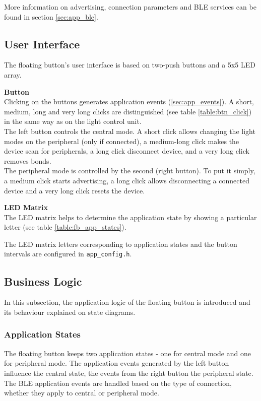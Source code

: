         More information on advertising, connection parameters and BLE services can be found in section \ref{sec:app_ble}.
    
    \subsection{User Interface}
        The floating button's user interface is based on two-push buttons and a 5x5 LED array.
        
        \textbf{Button}\\
            Clicking on the buttons generates application events (\ref{sec:app_events}). A short, medium, long and very long clicks are distinguished (see table \ref{table:btn_click}) in the same way as on the light control unit.\\
            The left button controls the central mode. A short click allows changing the light modes on the peripheral (only if connected), a medium-long click makes the device scan for peripherals, a long click disconnect device, and a very long click removes bonds.\\
            The peripheral mode is controlled by the second (right button). To put it simply, a medium click starts advertising, a long click allows disconnecting a connected device and a very long click resets the device.
            
        \textbf{LED Matrix}\\
            The LED matrix helps to determine the application state by showing a particular letter (see table \ref{table:fb_app_states}).   
            
        The LED matrix letters corresponding to application states and the button intervals are configured in \verb|app_config.h|.
        
        
    \subsection{Business Logic}
        In this subsection, the application logic of the floating button is introduced and its behaviour explained on state diagrams. 
        
        \subsubsection{Application States}
        \label{sec:fb_app_states}
            The floating button keeps two application states - one for central mode and one for peripheral mode. The application events generated by the left button influence the central state, the events from the right button the peripheral state. The BLE application events are handled based on the type of connection, whether they apply to central or peripheral mode.\\
            
